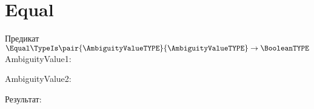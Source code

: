 \section{Equal}
\begin{frame}{Предикат $\Equal\TypeIs\pair{\AmbiguityValueTYPE}{\AmbiguityValueTYPE}\to\BooleanTYPE$}
	AmbiguityValue1:


	AmbiguityValue2:


	Результат:

\end{frame}
